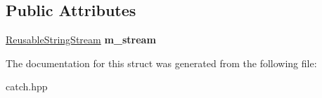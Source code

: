 \subsection*{Public Attributes}
\begin{DoxyCompactItemize}
\item 
\hyperlink{classCatch_1_1ReusableStringStream}{Reusable\+String\+Stream} {\bfseries m\+\_\+stream}\hypertarget{structCatch_1_1MessageStream_a9202520faed8882ef469db9f353ec578}{}\label{structCatch_1_1MessageStream_a9202520faed8882ef469db9f353ec578}

\end{DoxyCompactItemize}


The documentation for this struct was generated from the following file\+:\begin{DoxyCompactItemize}
\item 
catch.\+hpp\end{DoxyCompactItemize}
